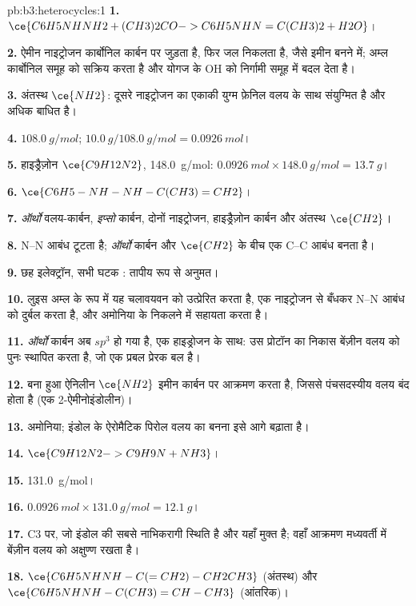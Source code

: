 \begin{solution}{pb:b3:heterocycles:1}
\textbf{1.} $\ce{C6H5NHNH2 + (CH3)2CO -> C6H5NHN=C(CH3)2 + H2O}$।

\textbf{2.} ऐमीन नाइट्रोजन कार्बोनिल कार्बन पर जुड़ता है, फिर जल निकलता है, जैसे
इमीन बनने में; अम्ल कार्बोनिल समूह को सक्रिय करता है और योगज के OH को
निर्गामी समूह में बदल देता है।

\textbf{3.} अंतस्थ $\ce{NH2}$: दूसरे नाइट्रोजन का एकाकी युग्म फ़ेनिल वलय के साथ संयुग्मित
है और अधिक बाधित है।

\textbf{4.} $\qty{108.0}{g/mol}$; $\qty{10.0}{g}/\qty{108.0}{g/mol} = \qty{0.0926}{mol}$।

\textbf{5.} हाइड्रैज़ोन $\ce{C9H12N2}$, \qty{148.0}{g/mol}: $\qty{0.0926}{mol} \times \qty{148.0}{g/mol} = \qty{13.7}{g}$।

\textbf{6.} $\ce{C6H5-NH-NH-C(CH3)=CH2}$।

\textbf{7.} \textit{ऑर्थो} वलय-कार्बन, \textit{इप्सो} कार्बन, दोनों नाइट्रोजन, हाइड्रैज़ोन कार्बन
और अंतस्थ $\ce{CH2}$।

\textbf{8.} N--N आबंध टूटता है; \textit{ऑर्थो} कार्बन और $\ce{CH2}$ के बीच एक C--C आबंध बनता है।

\textbf{9.} छह इलेक्ट्रॉन, सभी घटक : तापीय रूप से अनुमत।

\textbf{10.} लुइस अम्ल के रूप में यह चलावयवन को उत्प्रेरित करता है, एक नाइट्रोजन से बँधकर
N--N आबंध को दुर्बल करता है, और अमोनिया के निकलने में सहायता करता है।

\textbf{11.} \textit{ऑर्थो} कार्बन अब $sp^3$ हो गया है, एक हाइड्रोजन के साथ: उस प्रोटॉन का निकास
बेंज़ीन वलय को पुनः स्थापित करता है, जो एक प्रबल प्रेरक बल है।

\textbf{12.} बना हुआ ऐनिलीन $\ce{NH2}$ इमीन कार्बन पर आक्रमण करता है, जिससे
पंचसदस्यीय वलय बंद होता है (एक 2-ऐमीनोइंडोलीन)।

\textbf{13.} अमोनिया; इंडोल के ऐरोमैटिक पिरोल वलय का बनना इसे आगे बढ़ाता है।

\textbf{14.} $\ce{C9H12N2 -> C9H9N + NH3}$।

\textbf{15.} \qty{131.0}{g/mol}।

\textbf{16.} $\qty{0.0926}{mol} \times \qty{131.0}{g/mol} = \qty{12.1}{g}$।

\textbf{17.} C3 पर, जो इंडोल की सबसे नाभिकरागी स्थिति है और यहाँ मुक्त है; वहाँ आक्रमण
मध्यवर्ती में बेंज़ीन वलय को अक्षुण्ण रखता है।

\textbf{18.} $\ce{C6H5NHNH-C(=CH2)-CH2CH3}$ (अंतस्थ) और $\ce{C6H5NHNH-C(CH3)=CH-CH3}$ (आंतरिक)।


\end{solution}
